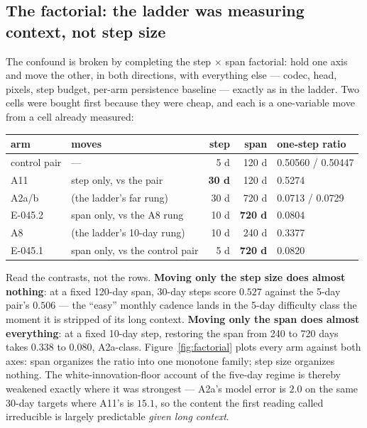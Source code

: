 \documentclass[10pt]{article}
\begin{document}
\subsection{The factorial: the ladder was measuring context, not step
size}\label{sec:factorial}

The confound is broken by completing the step $\times$ span factorial: hold
one axis and move the other, in both directions, with everything else ---
codec, head, pixels, step budget, per-arm persistence baseline --- exactly
as in the ladder. Two cells were bought first because they were cheap, and
each is a one-variable move from a cell already measured:

\begin{center}\small
\begin{tabular}{llrrl}
\toprule
arm & moves & step & span & one-step ratio \\
\midrule
control pair & --- & 5 d & 120 d & 0.50560 / 0.50447 \\
A11 & step only, vs the pair & \textbf{30 d} & 120 d & 0.5274 \\
A2a/b & (the ladder's far rung) & 30 d & 720 d & 0.0713 / 0.0729 \\
E-045.2 & span only, vs the A8 rung & 10 d & \textbf{720 d} & 0.0804 \\
A8 & (the ladder's 10-day rung) & 10 d & 240 d & 0.3377 \\
E-045.1 & span only, vs the control pair & 5 d & \textbf{720 d} & 0.0820 \\
\bottomrule
\end{tabular}
\end{center}

Read the contrasts, not the rows. \textbf{Moving only the step size does
almost nothing}: at a fixed 120-day span, 30-day steps score $0.527$ against
the 5-day pair's $0.506$ --- the ``easy'' monthly cadence lands in the
5-day difficulty class the moment it is stripped of its long context.
\textbf{Moving only the span does almost everything}: at a fixed 10-day
step, restoring the span from 240 to 720 days takes $0.338$ to $0.080$,
A2a-class. Figure~\ref{fig:factorial} plots every arm against both axes:
span organizes the ratio into one monotone family; step size organizes
nothing. The white-innovation-floor account of the five-day regime is
thereby weakened exactly where it was strongest --- A2a's model error is
$2.0$ on the same 30-day targets where A11's is $15.1$, so the content the
first reading called irreducible is largely predictable \emph{given long
context}.
\end{document}
